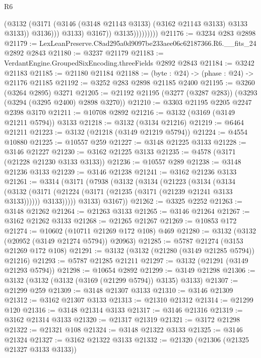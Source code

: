 \begin{lexlean}{R6}
\begin{coremodule}
                                (@3132
                                  (@3171
                                    (@3146 (@3148 @21143 @3133) (@3162 @21143 @3133) @3133 @3133))
                                  @3136)))
                            @3133)
                          @3167))
                      @3135)))))))))
@21176 := @3234 @283 @2898
@21179 := LexLeanPreserve.C8ad295a0d9097be233aee06c62187366.R6.__fits_24 @2892 @2843
@21180 := @3237 @21179
@21183 := VerdantEngine.GroupedSixEncoding.threeFields @2892 @2843
@21184 := @3242 @21183
@21185 := @21180 @21184
@21188 := (byte : @24) -> (phase : @24) -> @21176 @21185
@21192 := @3252 @283 @2898 @21185 @2400
@21195 := @3260 (@3264 @2895) @3271
@21205 := @21192 @21195 (@3277 (@3287 @283)) (@3293 (@3294 (@3295 @2400) @2898 @3270))
@21210 := @3303 @21195 @2205 @2247 @2398 @3170
@21211 := @10708 @2892
@21216 := @3132 (@3169 (@3149 @21211 @5794)) @3133
@21218 := @3132 (@3134 @21216)
@21219 := @6464 @21211
@21223 := @3132 (@21218 (@3149 @21219 @5794))
@21224 := @4554 @10880
@21225 := @10557 @259
@21227 := @3148 @21225 @3133
@21228 := @3146 @21227
@21230 := @3162 @21225 @3133
@21235 := @4578 (@3171 (@21228 @21230 @3133 @3133))
@21236 := @10557 @289
@21238 := @3148 @21236 @3133
@21239 := @3146 @21238
@21241 := @3162 @21236 @3133
@21261 := @3314
    (@3171
      (@7938
        (@3132
          (@3134
            (@21223
              (@3134
                (@3134
                  (@3132
                    (@3171 (@21224 (@3171 (@21235 (@3171 (@21239 @21241 @3133 @3133))))))
                    @3133)))))
          @3133)
        @3167))
@21262 := @3325 @2252
@21263 := @3148 @21262
@21264 := @21263 @3133
@21265 := @3146 @21264
@21267 := @3162 @21262 @3133
@21268 := @21265 @21267
@21269 := @10853 @172
@21274 := @10602 (@10711 @21269 @172 @108) @469
@21280 := @3132 (@3132 (@20952 (@3149 @21274 @5794)) @20963)
@21285 := @5787 @21274 (@3153 @21269 @172 @108)
@21291 := @3132 (@3132 (@21280 (@3149 @21285 @5794)) @21216)
@21293 := @5787 @21285 @21211
@21297 := @3132 (@21291 (@3149 @21293 @5794))
@21298 := @10654 @2892
@21299 := @3149 @21298
@21306 := @3132 (@3132 (@3132 (@3169 (@21299 @5794)) @3135) @3133)
@21307 := @21299 @259
@21309 := @3148 @21307 @3133
@21310 := @3146 @21309
@21312 := @3162 @21307 @3133
@21313 := @21310 @21312
@21314 := @21299 @120
@21316 := @3148 @21314 @3133
@21317 := @3146 @21316
@21319 := @3162 @21314 @3133
@21320 := @21317 @21319
@21321 := @3172 @21298
@21322 := @21321 @108
@21324 := @3148 @21322 @3133
@21325 := @3146 @21324
@21327 := @3162 @21322 @3133
@21332 := @21320 (@21306 (@21325 @21327 @3133 @3133))

\end{coremodule}
\end{lexlean}

